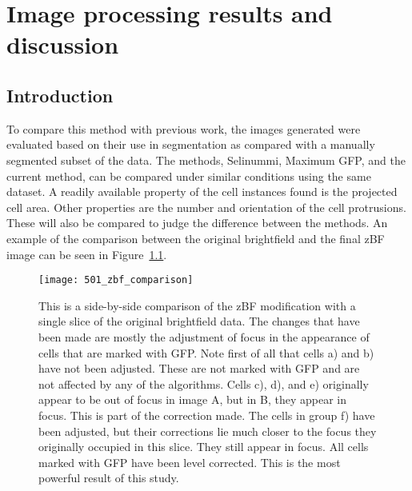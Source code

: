 
\chapter{Image processing results and discussion}

\ifpdf
    \graphicspath{{Chapter5/Figs/Raster/}{Chapter5/Figs/PDF/}{Chapter5/Figs/}}
\else
    \graphicspath{{Chapter5/Figs/Vector/}{Chapter5/Figs/}}
\fi

\section{Introduction}

To compare this method with previous work, the images generated were evaluated based on their use in segmentation as compared with a manually segmented subset of the data. The methods, Selinummi, Maximum GFP, and the current method, can be compared under similar conditions using the same dataset. A readily available property of the cell instances found is the projected cell area. Other properties are the number and orientation of the cell protrusions. These will also be compared to judge the difference between the methods. An example of the comparison between the original brightfield and the final zBF image can be seen in Figure~\ref{fig:zbfcomparison}.

\begin{figure}[h!]
 \centering
 \texttt{[image: 501\_zbf\_comparison]}
 \caption[zBF comparison with brightfield]{
 	This is a side-by-side comparison of the zBF modification with a single slice of the original brightfield data. The changes that have been made are mostly the adjustment of focus in the appearance of cells that are marked with GFP. Note first of all that cells a) and b) have not been adjusted. These are not marked with GFP and are not affected by any of the algorithms. Cells c), d), and e) originally appear to be out of focus in image A, but in B, they appear in focus. This is part of the correction made. The cells in group f) have been adjusted, but their corrections lie much closer to the focus they originally occupied in this slice. They still appear in focus. All cells marked with GFP have been level corrected. This is the most powerful result of this study.
 }
 \label{fig:zbfcomparison}
\end{figure}

